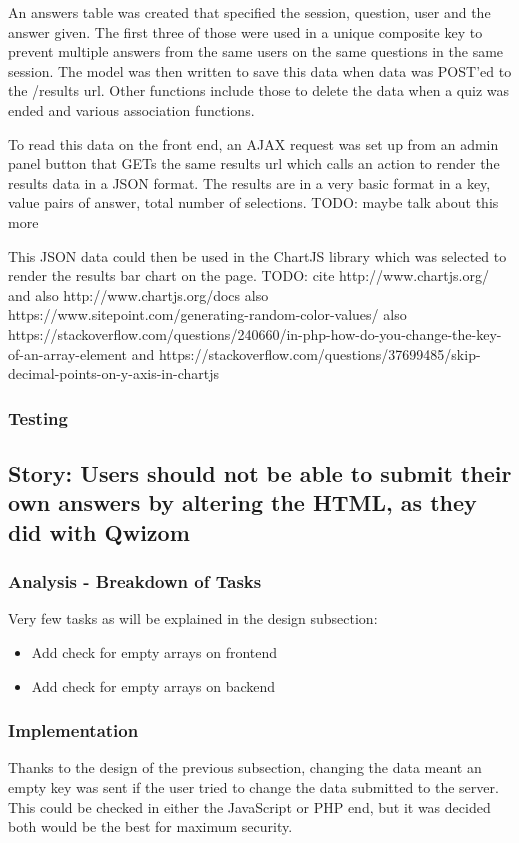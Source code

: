 An answers table was created that specified the session, question, user and the answer given. The first three of those were used in a unique composite key to prevent multiple answers from the same users on the same questions in the same session. The model was then written to save this data when data was POST'ed to the /results url. Other functions include those to delete the data when a quiz was ended and various association functions.

To read this data on the front end, an AJAX request was set up from an admin panel button that GETs the same results url which calls an action to render the results data in a JSON format. The results are in a very basic format in a key, value pairs of answer, total number of selections. TODO: maybe talk about this more

This JSON data could then be used in the ChartJS library which was selected to render the results bar chart on the page. TODO: cite http://www.chartjs.org/ and also http://www.chartjs.org/docs also https://www.sitepoint.com/generating-random-color-values/ also https://stackoverflow.com/questions/240660/in-php-how-do-you-change-the-key-of-an-array-element and https://stackoverflow.com/questions/37699485/skip-decimal-points-on-y-axis-in-chartjs
\subsubsection{Testing}
\newpage

\subsection{Story: Users should not be able to submit their own answers by altering the HTML, as they did with Qwizom}
\subsubsection{Analysis - Breakdown of Tasks}
Very few tasks as will be explained in the design subsection:
\begin{itemize}
	\item Add check for empty arrays on frontend
	\item Add check for empty arrays on backend
\end{itemize}
\subsubsection{Implementation}
Thanks to the design of the previous subsection, changing the data meant an empty key was sent if the user tried to change the data submitted to the server. This could be checked in either the JavaScript or PHP end, but it was decided both would be the best for maximum security. 
